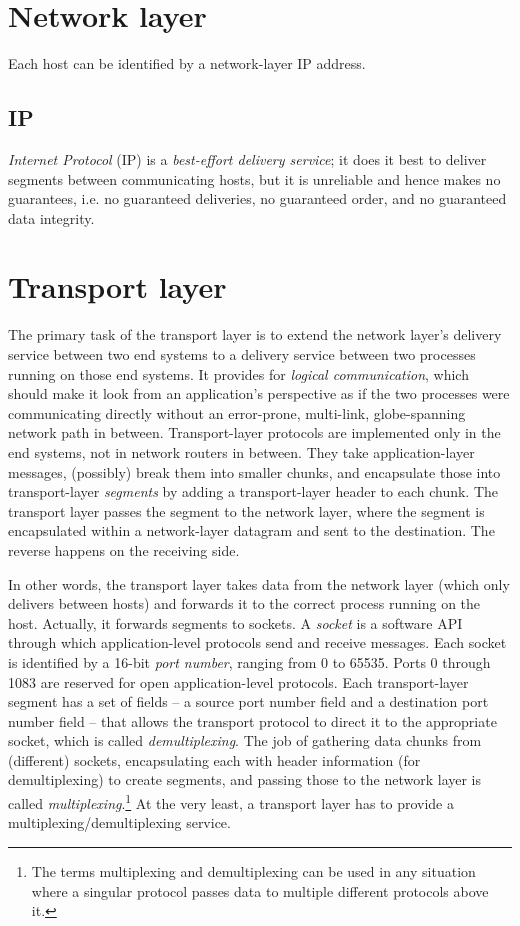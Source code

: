 \documentclass[8pt, table, xcdraw]{article}%
\begin{document}
\section{Network layer} \label{ch:network}

Each host can be identified by a network-layer IP address.

\subsection{IP}

\emph{Internet Protocol} (IP) is a \emph{best-effort delivery service}; it does it best to deliver segments between communicating hosts, but it is unreliable and hence makes no guarantees, i.e. no guaranteed deliveries, no guaranteed order, and no guaranteed data integrity.

\section{Transport layer} \label{ch:transport}

The primary task of the transport layer is to extend the network layer's delivery service between two end systems to a delivery service between two processes running on those end systems. It provides for \emph{logical communication}, which should make it look from an application’s perspective as if the two processes were communicating directly without an error-prone, multi-link, globe-spanning network path in between. Transport-layer protocols are implemented only in the end
systems, not in network routers in between. They take application-layer messages, (possibly) break them into smaller chunks, and encapsulate those into transport-layer \emph{segments} by adding a transport-layer header to each chunk. The transport layer passes the segment to the network layer, where the segment is encapsulated within a network-layer datagram and sent to the destination. The reverse happens on the receiving side.

In other words, the transport layer takes data from the network layer (which only delivers between hosts) and forwards it to the correct process running on the host. Actually, it forwards segments to sockets. A \emph{socket} is a software API through which application-level protocols send and receive messages. Each socket is identified by a 16-bit \emph{port number}, ranging from 0 to 65535. Ports 0 through 1083 are reserved for open application-level protocols. Each transport-layer segment has a set of fields -- a source port number field and a destination port number field -- that allows the transport protocol to direct it to the appropriate socket, which is called \emph{demultiplexing}. The job of gathering data chunks from (different) sockets, encapsulating each with header information (for demultiplexing) to create segments, and passing those to the network layer is called \emph{multiplexing}.\footnote{The terms multiplexing and demultiplexing can be used in any situation where a singular protocol passes data to multiple different protocols above it.} At the very least, a transport layer has to provide a multiplexing/demultiplexing service.
\end{document}
